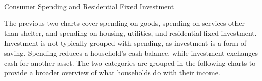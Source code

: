 \begin{minipage}{0.36\textwidth}
\\
\end{minipage} \hspace{5mm}
\begin{minipage}{0.36\textwidth}
\small 
\end{minipage}
\newpage 
\begin{minipage}{0.76\textwidth}    
\normalsize Consumer Spending and Residential Fixed Investment

\small The previous two charts cover spending on goods, spending on services other than shelter, and spending on housing, utilities, and residential fixed investment. Investment is not typically grouped with spending, as investment is a form of saving. Spending reduces a household's cash balance, while investment exchanges cash for another asset. The two categories are grouped in the following charts to provide a broader overview of what households do with their income. 
\end{minipage}
\vspace{1mm}

